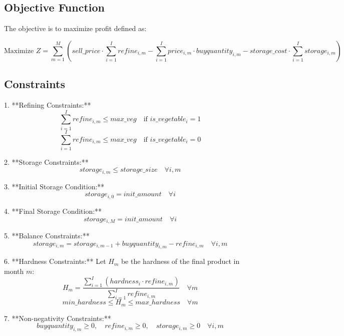 \documentclass{article}
\begin{document}
\subsection*{Objective Function}

The objective is to maximize profit defined as:

\[
\text{Maximize } Z = \sum_{m=1}^{M} \left( sell\_price \cdot \sum_{i=1}^{I} refine_{i,m} - \sum_{i=1}^{I} price_{i,m} \cdot buyquantity_{i,m} - storage\_cost \cdot \sum_{i=1}^{I} storage_{i,m} \right)
\]

\subsection*{Constraints}

1. **Refining Constraints:**
   \[
   \sum_{i=1}^{I} refine_{i,m} \leq max\_veg \quad \text{if } is\_vegetable_{i}=1
   \]
   \[
   \sum_{i=1}^{I} refine_{i,m} \leq max\_veg \quad \text{if } is\_vegetable_{i}=0
   \]

2. **Storage Constraints:**
   \[
   storage_{i,m} \leq storage\_size \quad \forall i,m
   \]

3. **Initial Storage Condition:**
   \[
   storage_{i,0} = init\_amount \quad \forall i
   \]

4. **Final Storage Condition:**
   \[
   storage_{i,M} = init\_amount \quad \forall i
   \]

5. **Balance Constraints:**
   \[
   storage_{i,m} = storage_{i,m-1} + buyquantity_{i,m} - refine_{i,m} \quad \forall i, m
   \]

6. **Hardness Constraints:**
   Let $H_m$ be the hardness of the final product in month $m$:
   \[
   H_m = \frac{\sum_{i=1}^{I} (hardness_{i} \cdot refine_{i,m})}{\sum_{i=1}^{I} refine_{i,m}} \quad \forall m
   \]
   \[
   min\_hardness \leq H_m \leq max\_hardness \quad \forall m
   \]

7. **Non-negativity Constraints:**
   \[
   buyquantity_{i,m} \geq 0, \quad refine_{i,m} \geq 0, \quad storage_{i,m} \geq 0 \quad \forall i, m
   \]
\end{document}
